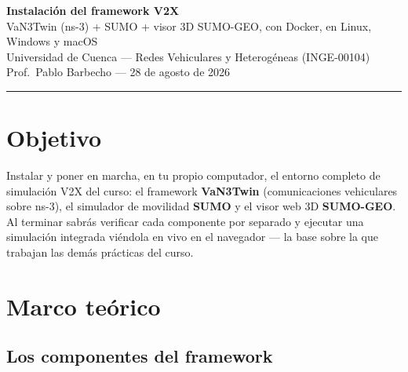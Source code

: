 \documentclass[11pt,a4paper]{article}
\begin{document}
\begin{center}
  {\color{azul}\LARGE\bfseries Instalación del framework V2X}\\[4pt]
  {\color{gris}\large VaN3Twin (ns-3) + SUMO + visor 3D SUMO-GEO, con Docker, en Linux, Windows y macOS}\\[6pt]
  {\small Universidad de Cuenca --- Redes Vehiculares y Heterogéneas (INGE-00104)\\
  Prof.\ Pablo Barbecho --- 28 de agosto de 2026}
\end{center}

\vspace{2pt}\hrule\vspace{8pt}

\tableofcontents

\section{Objetivo}

Instalar y poner en marcha, en tu propio computador, el entorno completo de
simulación V2X del curso: el framework \textbf{VaN3Twin} (comunicaciones
vehiculares sobre ns-3), el simulador de movilidad \textbf{SUMO} y el visor
web 3D \textbf{SUMO-GEO}. Al terminar sabrás verificar cada componente por
separado y ejecutar una simulación integrada viéndola en vivo en el navegador
--- la base sobre la que trabajan las demás prácticas del curso.

\section{Marco teórico}

\subsection{Los componentes del framework}
\end{document}
